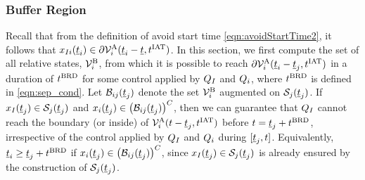 \subsubsection{Buffer Region} \label{sec:buffRegion_case1}
Recall that from the definition of avoid start time \eqref{eqn:avoidStartTime2}, it follows that $x_{I i}(\underline{t}_i) \in \partial \mathcal{V}^{\text{A}}_{i}(\underline{t}_i-\underline{t}, t^\text{IAT})$. In this section, we first compute the set of all relative states, $\mathcal{V}^{\text{B}}_{i}$, from which it is possible to reach $\partial \mathcal{V}^{\text{A}}_{i}(\underline{t}_i-\underline{t}_j, t^\text{IAT})$ in a duration of $t^\text{BRD}$ for some control applied by $Q_{I}$ and $Q_i$, where $t^\text{BRD}$ is defined in \eqref{eqn:sep_cond}. Let $\mathcal{B}_{ij}(\underline{t}_j)$ denote the set $\mathcal{V}^{\text{B}}_{i}$ augmented on $\mathcal{S}_j(\underline{t}_j)$. If $x_{I}(\underline{t}_j) \in \mathcal{S}_j(\underline{t}_j)$ and $x_i(\underline{t}_j) \in \left(\mathcal{B}_{ij}(\underline{t}_j)\right)^C$, then we can guarantee that $Q_{I}$ cannot reach the boundary (or inside) of $\mathcal{V}^{\text{A}}_{i}(t-\underline{t}_j, t^\text{IAT})$ before $t = \underline{t}_j + t^\text{BRD}$, irrespective of the control applied by $Q_{I}$ and $Q_i$ during $[\underline{t}_j, t]$. Equivalently, $\underline{t}_i \geq \underline{t}_j + t^\text{BRD}$ if $x_i(\underline{t}_j) \in \left(\mathcal{B}_{ij}(\underline{t}_j)\right)^C$, since $x_{I}(\underline{t}_j) \in \mathcal{S}_j(\underline{t}_j)$ is already ensured by the construction of $\mathcal{S}_j(\underline{t}_j)$.
%
%

